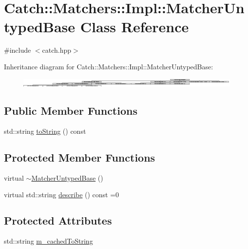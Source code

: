 \hypertarget{class_catch_1_1_matchers_1_1_impl_1_1_matcher_untyped_base}{}\section{Catch\+:\+:Matchers\+:\+:Impl\+:\+:Matcher\+Untyped\+Base Class Reference}
\label{class_catch_1_1_matchers_1_1_impl_1_1_matcher_untyped_base}


{\ttfamily \#include $<$catch.\+hpp$>$}

Inheritance diagram for Catch\+:\+:Matchers\+:\+:Impl\+:\+:Matcher\+Untyped\+Base\+:\begin{figure}[H]
\begin{center}
\leavevmode
\includegraphics[height=0.471380cm]{class_catch_1_1_matchers_1_1_impl_1_1_matcher_untyped_base}
\end{center}
\end{figure}
\subsection*{Public Member Functions}
\begin{DoxyCompactItemize}
\item 
std\+::string \mbox{\hyperlink{class_catch_1_1_matchers_1_1_impl_1_1_matcher_untyped_base_a5982c7c80ca71dfe2298babadad7a453}{to\+String}} () const
\end{DoxyCompactItemize}
\subsection*{Protected Member Functions}
\begin{DoxyCompactItemize}
\item 
virtual \mbox{\hyperlink{class_catch_1_1_matchers_1_1_impl_1_1_matcher_untyped_base_a853be93ce33f71b5abede38081c79e9d}{$\sim$\+Matcher\+Untyped\+Base}} ()
\item 
virtual std\+::string \mbox{\hyperlink{class_catch_1_1_matchers_1_1_impl_1_1_matcher_untyped_base_a91d3a907dbfcbb596077df24f6e11fe2}{describe}} () const =0
\end{DoxyCompactItemize}
\subsection*{Protected Attributes}
\begin{DoxyCompactItemize}
\item 
std\+::string \mbox{\hyperlink{class_catch_1_1_matchers_1_1_impl_1_1_matcher_untyped_base_a951095c462657e7097a9a6dc4dde813f}{m\+\_\+cached\+To\+String}}
\end{DoxyCompactItemize}


